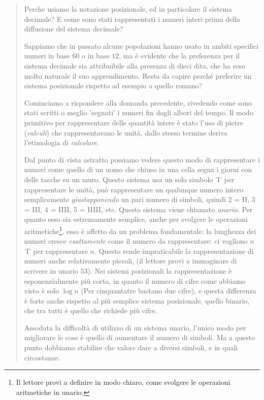 \begin{quote}
\sffamily \small

Perche usiamo la notazione posizionale, ed in particolare il sistema decimale?
E come sono stati rappresentati i numeri interi prima della diffusione del
sistema decimale?

Sappiamo che in passato alcune popolazioni hanno usato in ambiti specifici
numeri in base $60$ o in base $12$, ma è evidente che la preferenza per il
sistema decimale sia attribuibile alla presenza di dieci dita, che ha reso
molto naturale il suo apprendimento. Resta da capire perché preferire un
sistema posizionale rispetto ad esempio a quello romano?

Cominciamo a rispondere alla domanda precedente, rivedendo come sono stati
scritti o meglio 'segnati' i numeri fin dagli albori del tempo. Il modo
primitivo per rappresentare delle quantità intere è stato l'uso di pietre
(\emph{calculi}) che rappresentavano le unità, dallo stesso termine deriva
l'etimologia di \emph{calcolare}.

Dal punto di vista astratto possiamo vedere questo modo di rappresentare i
numeri come quello di un uomo che chiuso in una cella segna i giorni con delle
tacche su un muro. Questo sistema usa un solo simbolo '\textsc{I}' per
rappresentare le unità, può rappresentare un qualunque numero intero
semplicemente \emph{giustapponendo} un pari numero di simboli, quindi 2 =
\textsc{II}, 3 = \textsc{III}, 4 = \textsc{IIII}, 5 = \textsc{IIIII}, etc.
Questo sistema viene chiamato \emph{unario}. Per quanto
esso sia estremamente semplice, anche per svolgere le operazioni
aritmetiche\footnote{Il lettore provi a definire in modo chiaro, come svolgere
le operazioni aritmetiche in unario.}, esso è affetto da un problema
fondamentale: la lunghezza dei numeri cresce \emph{esattamente} come il numero
da rappresentare: ci vogliono $n$ 'I' per rappresentare $n$. Questo rende
impraticabile la rappresentazione di numeri anche relativamente piccoli, (il
lettore provi a immaginare di scrivere in unario $53$). Nei sistemi posizionali
la rappresentazione è esponenzialmente più corta, in quanto il numero di cifre
come abbiamo visto è solo $\log n$ (Per cinquantatre bastano due cifre), e
questa differenza è forte anche rispetto al più semplice sistema posizionale,
quello binario, che tra tutti è quello che richiede più cifre.

Assodata la difficoltà di utilizzo di un sistema unario, l'unico modo per
migliorare le cose è quello di aumentare il numero di simboli. Ma a questo
punto dobbiamo stabilire che valore dare a diversi simboli, e in quali
circostanze.


\end{quote}
